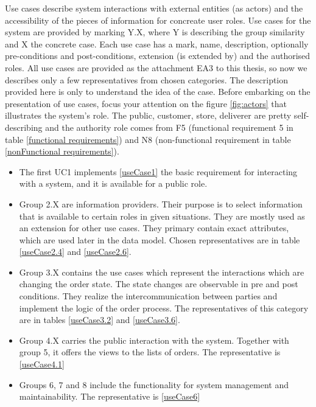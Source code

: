 \documentclass[thesis=M,english]{FITthesis}[2019/12/23]
\begin{document}
Use cases describe system interactions with external entities (as actors) and the accessibility of the pieces of information for concreate user roles. Use cases for the system are provided by marking Y.X, where Y is describing the group similarity and X the concrete case. Each use case has a mark, name, description, optionally pre-conditions and post-conditions, extension (is extended by) and the authorised roles.
All use cases are provided as the attachment EA3 to this thesis, so now we describes only a few representatives from chosen categories. The description provided here is only to understand the idea of the case. Before embarking on the presentation of use cases, focus your attention on the figure \ref{fig:actors} that illustrates the system's role. The public, customer, store, deliverer are pretty self-describing and the authority role comes from F5 (functional requirement 5 in table \ref{functional requirements}) and N8 (non-functional requirement in table \ref{nonFunctional requirements}).
\begin{itemize}
\item The first UC1 implements \ref{useCase1} the basic requirement for interacting with a system, and it is available for a public role.

\item Group 2.X are information providers. Their purpose is to select information that is available to certain roles in given situations. They are mostly used as an extension for other use cases. They primary contain exact attributes, which are used later in the data model. Chosen representatives are in table \ref{useCase2.4} and \ref{useCase2.6}.

\item Group 3.X contains the use cases which represent the interactions which are changing the order state. The state changes are observable in pre and post conditions. They realize the intercommunication between parties and implement the logic of the order process. The representatives of this category are in tables \ref{useCase3.2} and \ref{useCase3.6}.

\item Group 4.X carries the public interaction with the system. Together with group 5, it offers the views to the lists of orders. The representative is \ref{useCase4.1}

\item Groups 6, 7 and 8 include the functionality for system management and maintainability. The representative is \ref{useCase6}

\end{itemize}
\end{document}
